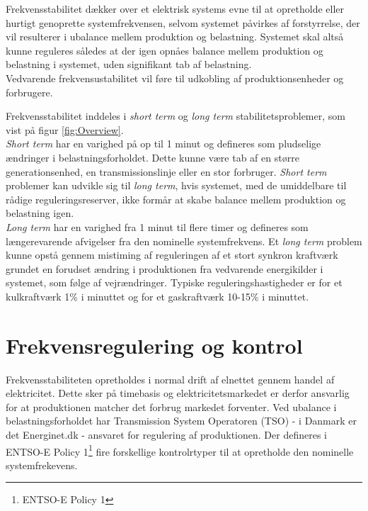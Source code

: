 
\label{Frekvensstabilitet}

Frekvensstabilitet dækker over et elektrisk systems evne til at opretholde eller hurtigt genoprette systemfrekvensen, selvom systemet påvirkes af forstyrrelse, der vil resulterer i ubalance mellem produktion og belastning. Systemet skal altså kunne reguleres således at der igen opnåes balance mellem produktion og belastning i systemet, uden signifikant tab af belastning.\\
Vedvarende frekvensustabilitet vil føre til udkobling af produktionsenheder og forbrugere.

Frekvensstabilitet inddeles i \textit{short term} og \textit{long term} stabilitetsproblemer, som vist på figur \ref{fig:Overview}.\\
\textit{Short term} har en varighed på op til 1 minut og defineres som pludselige ændringer i belastningsforholdet. Dette kunne være tab af en større generationsenhed, en transmissionslinje eller en stor forbruger. \textit{Short term} problemer kan udvikle sig til \textit{long term}, hvis systemet, med de umiddelbare til rådige reguleringsreserver, ikke formår at skabe balance mellem produktion og belastning igen.\\
\textit{Long term} har en varighed fra 1 minut til flere timer og defineres som længerevarende afvigelser fra den nominelle systemfrekvens. Et \textit{long term} problem kunne opstå gennem mistiming af reguleringen af et stort synkron kraftværk grundet en forudset ændring i produktionen fra vedvarende energikilder i systemet, som følge af vejrændringer.
Typiske reguleringshastigheder er for et kulkraftværk 1\% i minuttet og for et gaskraftværk 10-15\% i minuttet.

\section{Frekvensregulering og kontrol}
Frekvensstabiliteten opretholdes i normal drift af elnettet gennem handel af elektricitet. Dette sker på timebasis og elektricitetsmarkedet er derfor ansvarlig for at produktionen matcher det forbrug markedet forventer. Ved ubalance i belastningsforholdet har Transmission System Operatoren (TSO) - i Danmark er det Energinet.dk - ansvaret for regulering af produktionen. Der defineres i ENTSO-E Policy 1\footnote{ENTSO-E Policy 1} fire forskellige kontrolrtyper til at opretholde den nominelle systemfrekevens.

